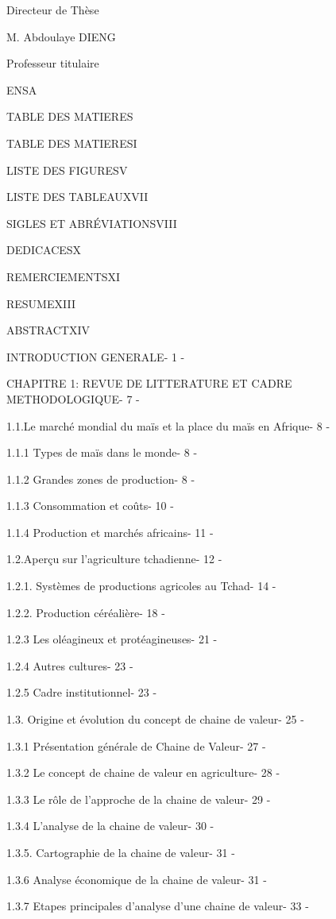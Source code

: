 \documentclass[12pt,oneside]{report}
\begin{document}
Directeur de Thèse

M. Abdoulaye DIENG

Professeur titulaire

ENSA

TABLE DES MATIERES

TABLE DES MATIERESI

LISTE DES FIGURESV

LISTE DES TABLEAUXVII

SIGLES ET ABRÉVIATIONSVIII

DEDICACESX

REMERCIEMENTSXI

RESUMEXIII

ABSTRACTXIV

INTRODUCTION GENERALE- 1 -

CHAPITRE 1: REVUE DE LITTERATURE ET CADRE METHODOLOGIQUE- 7 -

1.1.Le marché mondial du maïs et la place du maïs en Afrique- 8 -

1.1.1 Types de maïs dans le monde- 8 -

1.1.2 Grandes zones de production- 8 -

1.1.3 Consommation et coûts- 10 -

1.1.4 Production et marchés africains- 11 -

1.2.Aperçu sur l’agriculture tchadienne- 12 -

1.2.1. Systèmes de productions agricoles au Tchad- 14 -

1.2.2. Production céréalière- 18 -

1.2.3 Les oléagineux et protéagineuses- 21 -

1.2.4 Autres cultures- 23 -

1.2.5 Cadre institutionnel- 23 -

1.3. Origine et évolution du concept de chaine de valeur- 25 -

1.3.1 Présentation générale de Chaine de Valeur- 27 -

1.3.2 Le concept de chaine de valeur en agriculture- 28 -

1.3.3 Le rôle de l’approche de la chaine de valeur- 29 -

1.3.4 L’analyse de la chaine de valeur- 30 -

1.3.5. Cartographie de la chaine de valeur- 31 -

1.3.6 Analyse économique de la chaine de valeur- 31 -

1.3.7 Etapes principales d’analyse d’une chaine de valeur- 33 -
\end{document}
